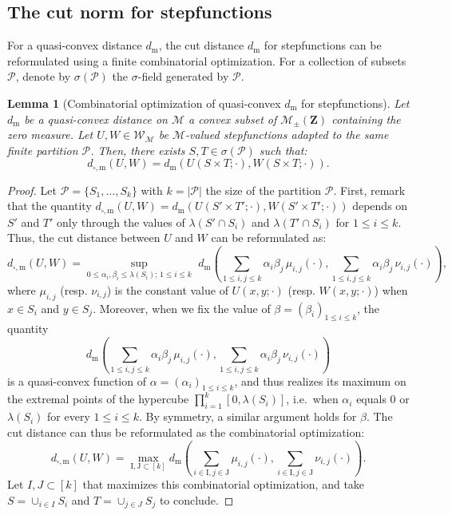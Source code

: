 \documentclass{amsart}
\newcommand{\ie}{i.e.\ }
\theoremstyle{plain}
\newtheorem{lemme}[Th]{Lemma}
\theoremstyle{definition}
\newcommand{\Space}{\mathbf{Z}}
\newcommand{\cm}{\mathcal{M}}
\newcommand{\cp}{\mathcal{P}}
\newcommand{\cM}{\mathcal{M}}
\newcommand{\SignedMeas}{\mathcal{M}_{\pm}(\Space)}
\newcommand{\KernelM}{\mathcal{W}_\cm}
\newcommand{\m}{\mathrm{m}}
\newcommand{\dmeas}{d_\m}
\newcommand{\dcut}{d_{\square,\m}}
\begin{document}
\subsection{The cut norm for stepfunctions}\label{Section_cut_dist_combi}

For a quasi-convex distance $\dmeas$,
the cut distance $\dmeas$ for stepfunctions
can be reformulated using a finite combinatorial optimization. 
For a collection of subsets $\cp$, denote by $\sigma(\cp)$ the $\sigma$-field
generated by $\cp$. 

\begin{lemme}[Combinatorial optimization of quasi-convex $\dmeas$ for stepfunctions]\label{lemma_cut_dist_combi_2}
Let $\dmeas$ be a quasi-convex distance on $\cM$ a convex subset of $\SignedMeas$ containing the zero measure.
Let $U, W\in\KernelM$ be $\cM$-valued stepfunctions adapted to the same finite partition $\cp$. 
Then, there exists $S, T \in \sigma(\cp)$ such that:
\begin{equation*}
  \dcut(U,W) =\dmeas(U(S\times T;\cdot), W(S\times T;\cdot)).
\end{equation*}
\end{lemme}

\begin{proof}
Let $\cp=\{S_1, \ldots, S_k\}$ with $k=\vert\cp\vert$ the size of the partition $\cp$.
  First, remark that the quantity
 $\dcut(U,W) =\dmeas(U(S'\times T';\cdot), W(S'\times T';\cdot))$
depends on $S'$ and $T'$ only through the values of $\lambda(S'\cap  S_i)$ 
and $\lambda(T'\cap S_i)$ for $1\leq i\leq k$.
Thus, the cut distance between $U$ and $W$ can be reformulated as:
\[
\dcut(U,W) = \underset{0\leq \alpha_i, \beta_i  \leq \lambda(S_i) ;\,  1
  \leq i \leq k}{\sup} \, \, \dmeas\left(  
  	\sum_{1\leq i,j \leq k} \alpha_i \beta_j\, \mu_{i,j}(\cdot) ,
	\sum_{1\leq i,j \leq k} \alpha_i \beta_j\, \nu_{i,j}(\cdot) 	\right)  ,
\]
where $\mu_{i, j}$ (resp. $\nu_{i,j}$) is the constant value of $U(x,y; \cdot)$ (resp. $W(x,y; \cdot)$) 
	when $x\in S_i$ and $y\in S_j$. 
Moreover, when we fix the value of  $\beta = (\beta_i)_{1\leq i\leq k}$,
the quantity
\[ \dmeas\left(  
  	\sum_{1\leq i,j \leq k} \alpha_i \beta_j\, \mu_{i,j}(\cdot) ,
	\sum_{1\leq i,j \leq k} \alpha_i \beta_j\, \nu_{i,j}(\cdot) 	\right) \]
	is a  quasi-convex function of $\alpha = (\alpha_i)_{1\leq i\leq k}$, and
thus  realizes its  maximum  on  the extremal  points  of the  hypercube
$\prod_{i=1}^k [0,\lambda(S_i)]$,  \ie  when  $\alpha_i$ equals  $0$ or
$\lambda(S_i)$  for  every $1\leq  i\leq  k$.   By symmetry,  a  similar
argument holds for  $\beta$.  The cut distance can thus  be reformulated as
the combinatorial optimization:
\[
 \dcut(U,W) = \max_{\mathrm{I},\mathrm{J}\subset [ k]} \dmeas\left(  
  	\sum_{i\in \mathrm{I},j\in \mathrm{J}}  \mu_{i,j}(\cdot) ,
	\sum_{i\in \mathrm{I},j\in \mathrm{J}}  \nu_{i,j}(\cdot) 	\right)	 . 
\]
Let $I,J\subset[k]$ that maximizes this combinatorial optimization,
and take $S = \cup_{i\in I} S_i$ and $T = \cup_{j\in J} S_j$
	to conclude.
\end{proof}
\end{document}
